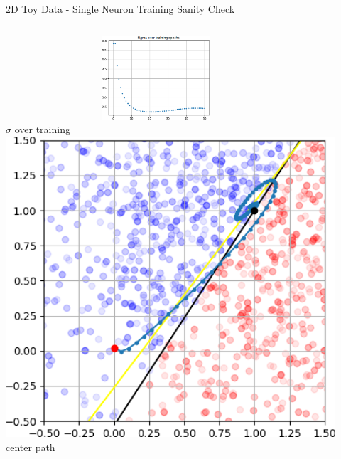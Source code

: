 \documentclass{beamer}
\begin{document}
\begin{frame}{2D Toy Data - Single Neuron Training Sanity Check}
\begin{columns}
    \hspace{0.1cm}
    \begin{column}{.31\textwidth}
        \vspace{0.1cm} \hspace{-0.01cm} \includegraphics[width=0.84\textwidth,height=3.1cm]{images/2D-single-neuron/2d-easy-sigma-training-cropped.png}\\
        \centering\footnotesize{$\sigma$ over training}\\
        \includegraphics[width=0.92\textwidth]{images/2D-single-neuron/2d-easy-center-path-cropped.png}\\
        \centering\footnotesize{center path}
        
    \end{column}
    \end{columns}

\end{frame}
\end{document}
